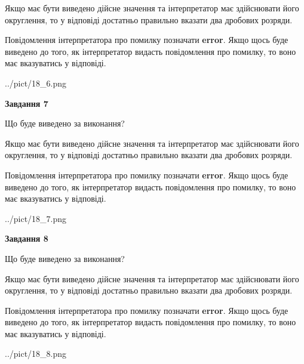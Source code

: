 \documentclass[12pt, ukrainian]{article}
\begin{document}
{\begin {Large}
Якщо має бути виведено дійсне значення та інтерпретатор має здійснювати його округлення, 
то у відповіді достатньо правильно вказати два дробових розряди.

Повідомлення інтерпретатора про помилку позначати \textbf{error}.
Якщо щось буде виведено до того, як інтерпретатор видасть повідомлення про помилку, 
то воно має вказуватись у відповіді. \par

\begin{center}
	{../pict/18_6.png}
\end{center}
\newpage

{\begin {center}\textbf{Завдання 7}\end {center}}\par
Що буде виведено за виконання? \par

Якщо має бути виведено дійсне значення та інтерпретатор має здійснювати його округлення, 
то у відповіді достатньо правильно вказати два дробових розряди.

Повідомлення інтерпретатора про помилку позначати \textbf{error}.
Якщо щось буде виведено до того, як інтерпретатор видасть повідомлення про помилку, 
то воно має вказуватись у відповіді. \par

\begin{center}
	{../pict/18_7.png}
\end{center}
\newpage

{\begin {center}\textbf{Завдання 8}\end {center}}\par
Що буде виведено за виконання? \par

Якщо має бути виведено дійсне значення та інтерпретатор має здійснювати його округлення, 
то у відповіді достатньо правильно вказати два дробових розряди.

Повідомлення інтерпретатора про помилку позначати \textbf{error}.
Якщо щось буде виведено до того, як інтерпретатор видасть повідомлення про помилку, 
то воно має вказуватись у відповіді. \par

\begin{center}
	{../pict/18_8.png}
\end{center}
\newpage


\end{Large}}
\end{document}
